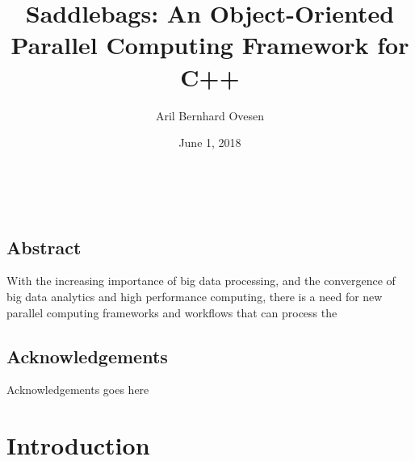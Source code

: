 \documentclass{uit-report}
\begin{document}

\title{Saddlebags: An Object-Oriented Parallel Computing Framework for C++}
\author{Aril Bernhard Ovesen}
\date{June 1, 2018}


\newpage\
\pagestyle{empty}

\mbox{}

\pagebreak
{}
\pagestyle{firststyle}
\section*{Abstract}


With the increasing importance of big data processing, and the convergence of big data analytics and high performance computing, there is a need for new parallel computing frameworks and workflows that can process the 


\newpage
\section*{Acknowledgements}

Acknowledgements goes here \lipsum[1]


\newpage
\tableofcontents
\pagebreak
\listoffigures
\pagebreak

\newpage
{}
\pagestyle{secondstyle}
\setcounter{page}{1}



\chapter{Introduction}




\end{document}
